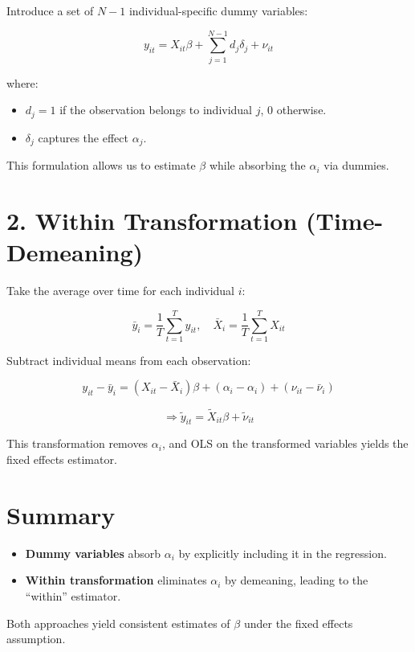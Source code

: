 \documentclass[12pt, oneside]{article}
\begin{document}
Introduce a set of \( N-1 \) individual-specific dummy variables:

\[
y_{it} = X_{it} \beta + \sum_{j=1}^{N-1} d_j \delta_j + \nu_{it}
\]

where:
\begin{itemize}
  \item \( d_j = 1 \) if the observation belongs to individual \( j \), 0 otherwise.
  \item \( \delta_j \) captures the effect \( \alpha_j \).
\end{itemize}

This formulation allows us to estimate \( \beta \) while absorbing the \( \alpha_i \) via dummies.

\section*{2. Within Transformation (Time-Demeaning)}

Take the average over time for each individual \( i \):

\[
\bar{y}_i = \frac{1}{T} \sum_{t=1}^T y_{it}, \quad
\bar{X}_i = \frac{1}{T} \sum_{t=1}^T X_{it}
\]

Subtract individual means from each observation:

\[
y_{it} - \bar{y}_i = (X_{it} - \bar{X}_i) \beta + (\alpha_i - \alpha_i) + (\nu_{it} - \bar{\nu}_i)
\]

\[
\Rightarrow \tilde{y}_{it} = \tilde{X}_{it} \beta + \tilde{\nu}_{it}
\]

This transformation removes \( \alpha_i \), and OLS on the transformed variables yields the fixed effects estimator.

\section*{Summary}

\begin{itemize}
  \item \textbf{Dummy variables} absorb \( \alpha_i \) by explicitly including it in the regression.
  \item \textbf{Within transformation} eliminates \( \alpha_i \) by demeaning, leading to the ``within'' estimator.
\end{itemize}

Both approaches yield consistent estimates of \( \beta \) under the fixed effects assumption.
\end{document}

